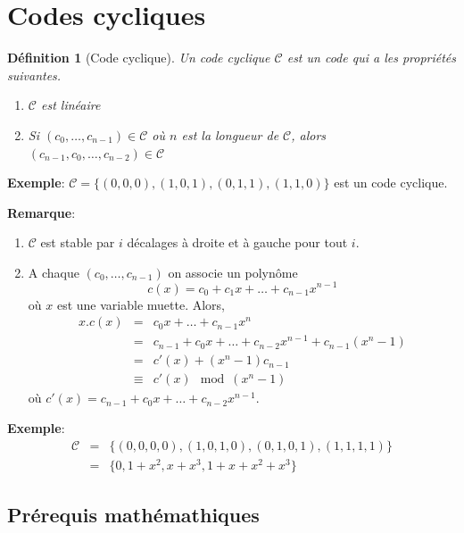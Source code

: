 \documentclass[a4paper,10pt,twocolumn]{article}
\theoremstyle{break}
\newcommand{\code}[1]{\mathcal{#1}}
\newcommand{\C}{\code{C}}
\newtheorem{mydef}{Définition}
\newenvironment{note}[1]
{\textbf{#1}:}
{}
\newenvironment{remarque}
{\begin{note}{Remarque}}
{\end{note}}
\newenvironment{exemple}
{\begin{note}{Exemple}}
{\end{note}}
\begin{document}
\section{Codes cycliques}
\begin{mydef}[Code cyclique]
 Un code cyclique $\C$ est un code qui a les propriétés suivantes.
 \begin{enumerate}
  \item $\C$ est linéaire
  \item Si $(c_0, \ldots, c_{n-1}) \in \C$ où $n$ est la longueur de $\C$, 
  alors $(c_{n-1}, c_0, \ldots, c_{n-2}) \in \C$
 \end{enumerate}
\end{mydef}

\begin{exemple}
 $\C = \{ (0,0,0), (1,0,1), (0,1,1), (1,1,0) \}$ est un code cyclique.
\end{exemple}

\begin{remarque}
\begin{enumerate}
 \item $\C$ est stable par $i$ décalages à droite et à gauche pour tout $i$.
 \item A chaque $(c_0, \ldots, c_{n-1})$ on associe un polynôme
 $$ c(x) = c_0 + c_1x + \ldots + c_{n-1}x^{n-1}$$
 où $x$ est une variable muette. Alors,
 \begin{eqnarray*}
  x.c(x) & = & c_0x + \ldots + c_{n-1}x^n \\
  & = & c_{n-1} + c_0x + \ldots + c_{n-2}x^{n-1} + c_{n-1}(x^n-1) \\
  & = & c'(x) + (x^n - 1)c_{n-1} \\
  & \equiv & c'(x)\mod (x^n - 1)
 \end{eqnarray*}
 où $c'(x) = c_{n-1} + c_0x + \ldots + c_{n-2}x^{n-1}$.
\end{enumerate}
\end{remarque}

\begin{exemple}
 \begin{eqnarray*}
  \C & = & \{ (0,0,0,0), (1,0,1,0), (0,1,0,1), (1,1,1,1) \} \\
     & = & \{ 0, 1+x^2, x+x^3, 1+x+x^2+x^3 \} 
 \end{eqnarray*}
\end{exemple}

\subsection{Prérequis mathémathiques}
\end{document}
